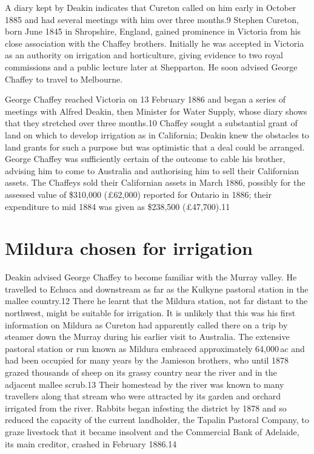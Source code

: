A diary kept by Deakin indicates that Cureton called on him early in
October 1885 and had several meetings with him over three months.9
Stephen Cureton, born June 1845 in Shropshire, England, gained
prominence in Victoria from his close association with the Chaffey
brothers.  Initially he was accepted in Victoria as an authority on
irrigation and horticulture, giving evidence to two royal commissions
and a public lecture later at Shepparton. He soon advised George
Chaffey to travel to Melbourne.

George Chaffey reached Victoria on 13 February 1886 and began a series
of meetings with Alfred Deakin, then Minister for Water Supply, whose
diary shows that they stretched over three months.10 Chaffey sought a
substantial grant of land on which to develop irrigation as in
California; Deakin knew the obstacles to land grants for such a
purpose but was optimistic that a deal could be arranged.  George
Chaffey was sufficiently certain of the outcome to cable his brother,
advising him to come to Australia and authorising him to sell their
Californian assets.  The Chaffeys sold their Californian assets in
March 1886, possibly for the assessed value of \$310,000
(\pounds62,000) reported for Ontario in 1886; their expenditure to mid
1884 was given as \$238,500 (\pounds47,700).11

\section{Mildura chosen for irrigation}

Deakin advised George Chaffey to become familiar with the Murray
valley.  He travelled to Echuca and downstream as far as the Kulkyne
pastoral station in the mallee country.12 There he learnt that the
Mildura station, not far distant to the northwest, might be suitable
for irrigation.  It is unlikely that this was his first information on
Mildura as Cureton had apparently called there on a trip by steamer
down the Murray during his earlier visit to Australia.  The extensive
pastoral station or run known as Mildura embraced approximately
64,000\,ac and had been occupied for many years by the Jamieson
brothers, who until 1878 grazed thousands of sheep on its grassy
country near the river and in the adjacent mallee scrub.13 Their
homestead by the river was known to many travellers along that stream
who were attracted by its garden and orchard irrigated from the river.
Rabbits began infesting the district by 1878 and so reduced the
capacity of the current landholder, the Tapalin Pastoral Company, to
graze livestock that it became insolvent and the Commercial Bank of
Adelaide, its main creditor, crashed in February 1886.14

